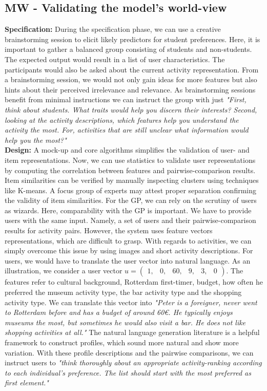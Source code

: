 \documentclass[11pt,a4paper,oneside]{article}
\begin{document}
\subsection{MW - Validating the model's world-view}
\textbf{Specification:} During the specification phase, we can use a creative brainstorming session to elicit likely predictors for student preferences. Here, it is important to gather a balanced group consisting of students and non-students. The expected output would result in a list of user characteristics. The participants would also be asked about the current activity representation. From a brainstorming session, we would not only gain ideas for more features but also hints about their perceived irrelevance and relevance. As brainstorming sessions benefit from minimal instructions we can instruct the group with just \emph{"First, think about students. What traits would help you discern their interests? Second, looking at the activity descriptions, which features help you understand the activity the most. For, activities that are still unclear what information would help you the most?"}\\
\textbf{Design:} A mock-up and core algorithms simplifies the validation of user- and item representations. Now, we can use statistics to validate user representations by computing the correlation between features and pairwise-comparison results. Item similarities can be verified by manually inspecting clusters using techniques like K-means. A focus group of experts may attest proper separation confirming the validity of item similarities. For the GP, we can rely on the scrutiny of users as wizards.\cite{masthoff_UserWizardMethod_2006a} Here, comparability with the GP is important. We have to provide users with the same input. Namely, a set of users and their pairwise-comparison results for activity pairs. However, the system uses feature vectors representations, which are difficult to grasp. With regards to activities, we can simply overcome this issue by using images and short activity descriptions. For users, we would have to translate the user vector into natural language. As an illustration, we consider a user vector $u = \left(\begin{smallmatrix} 1, & 0, & 60, & 9, & 3, & 0 \end{smallmatrix}\right)$. The features refer to cultural background, Rotterdam first-timer, budget, how often he preferred the museum activity type, the bar activity type and the shopping activity type. We can translate this vector into \emph{"Peter is a foreigner, never went to Rotterdam before and has a budget of around 60€. He typically enjoys museums the most, but sometimes he would also visit a bar. He does not like shopping activities at all."} The natural language generation literature is a helpful framework to construct profiles, which sound more natural and show more variation.\cite{goldberg_UsingNaturallanguageProcessing_1994} With these profile descriptions and the pairwise comparisons, we can instruct users to \emph{"think thoroughly about an appropriate activity-ranking according to each individual's preference. The list should start with the most preferred as first element."}\\
\end{document}
